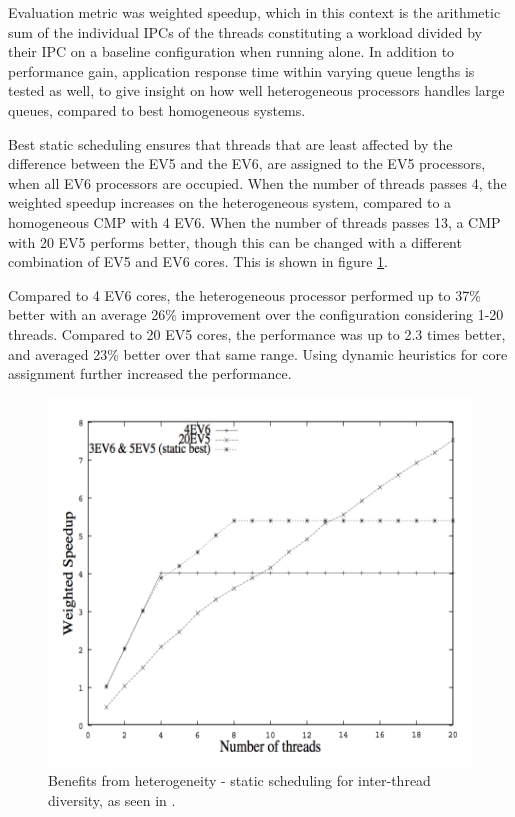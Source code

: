 Evaluation metric was weighted speedup, which in this context is the arithmetic sum of the individual IPCs of the threads constituting a workload divided by their IPC on a baseline configuration when running alone.
In addition to performance gain, application response time within varying queue lengths is tested as well, to give insight on how well heterogeneous processors handles large queues, compared to best homogeneous systems.

Best static scheduling ensures that threads that are least affected by the difference between the EV5 and the EV6, are assigned to the EV5 processors, when all EV6 processors are occupied.
When the number of threads passes 4, the weighted speedup increases on the heterogeneous system, compared to a homogeneous CMP with 4 EV6.
When the number of threads passes 13, a CMP with 20 EV5 performs better, though this can be changed with a different combination of EV5 and EV6 cores.
This is shown in figure \ref{fig:Kumar2}.

Compared to 4 EV6 cores, the heterogeneous processor performed up to 37\% better with an average 26\% improvement over the configuration considering 1-20 threads. 
Compared to 20 EV5 cores, the performance was up to 2.3 times better, and averaged 23\% better over that same range. \cite{heterogeneous-perf}
Using dynamic heuristics for core assignment further increased the performance.

\begin{figure}[htb]
    \centering
    \includegraphics[width=1.0\textwidth]{Figures/Heterogeneous/Kumar2}
    \caption{Benefits from heterogeneity - static scheduling for inter-thread diversity, as seen in \cite{heterogeneous-perf}.}
    \label{fig:Kumar2}
\end{figure}

